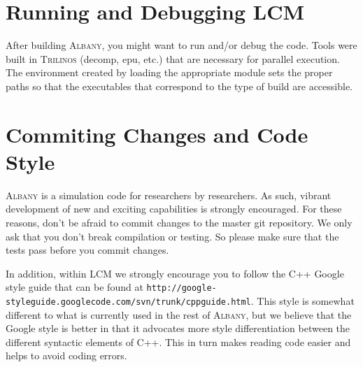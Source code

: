 \documentclass{article}
\newcommand{\trilinos}{\textsc{Trilinos}}
\newcommand{\albany}{\textsc{Albany}}
\newcommand{\lcm}{\textsc{LCM}}
\begin{document}
\section{Running and Debugging \lcm{}} 

After building \albany{}, you might want to run and/or debug the code.
Tools were built in \trilinos{} (decomp, epu, etc.) that are necessary
for parallel execution. The environment created by loading the
appropriate module sets the proper paths so that the executables that
correspond to the type of build are accessible.

\section{Commiting Changes and Code Style}
\albany{} is a simulation code for researchers by researchers. As
such, vibrant development of new and exciting capabilities is strongly
encouraged. For these reasons, don't be afraid to commit changes to
the master git repository. We only ask that you don't break
compilation or testing. So please make sure that the tests pass before
you commit changes.

In addition, within \lcm{} we strongly encourage you to follow the C++
Google style guide that can be found at
\verb+http://google-styleguide.googlecode.com/svn/trunk/cppguide.html+.
This style is somewhat different to what is currently used in the rest
of \albany{}, but we believe that the Google style is better in that
it advocates more style differentiation between the different
syntactic elements of C++. This in turn makes reading code easier and
helps to avoid coding errors.
\end{document}
